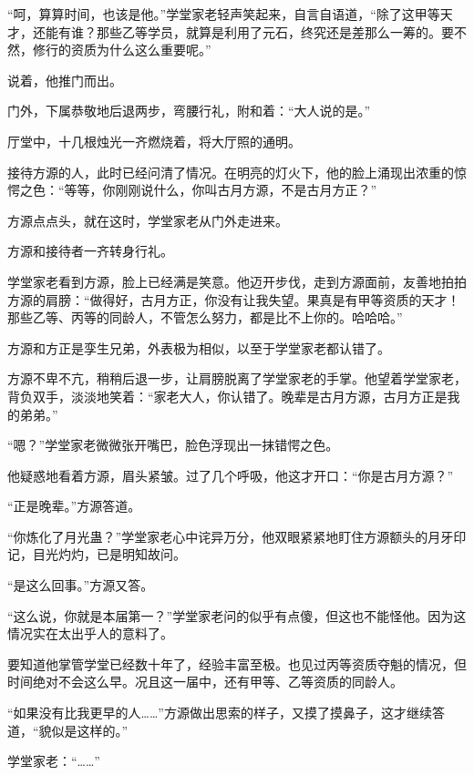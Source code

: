 \begin{this_body}
“呵，算算时间，也该是他。”学堂家老轻声笑起来，自言自语道，“除了这甲等天才，还能有谁？那些乙等学员，就算是利用了元石，终究还是差那么一筹的。要不然，修行的资质为什么这么重要呢。”

说着，他推门而出。

门外，下属恭敬地后退两步，弯腰行礼，附和着：“大人说的是。”

厅堂中，十几根烛光一齐燃烧着，将大厅照的通明。

接待方源的人，此时已经问清了情况。在明亮的灯火下，他的脸上涌现出浓重的惊愕之色：“等等，你刚刚说什么，你叫古月方源，不是古月方正？”

方源点点头，就在这时，学堂家老从门外走进来。

方源和接待者一齐转身行礼。

学堂家老看到方源，脸上已经满是笑意。他迈开步伐，走到方源面前，友善地拍拍方源的肩膀：“做得好，古月方正，你没有让我失望。果真是有甲等资质的天才！那些乙等、丙等的同龄人，不管怎么努力，都是比不上你的。哈哈哈。”

方源和方正是孪生兄弟，外表极为相似，以至于学堂家老都认错了。

方源不卑不亢，稍稍后退一步，让肩膀脱离了学堂家老的手掌。他望着学堂家老，背负双手，淡淡地笑着：“家老大人，你认错了。晚辈是古月方源，古月方正是我的弟弟。”

“嗯？”学堂家老微微张开嘴巴，脸色浮现出一抹错愕之色。

他疑惑地看着方源，眉头紧皱。过了几个呼吸，他这才开口：“你是古月方源？”

“正是晚辈。”方源答道。

“你炼化了月光蛊？”学堂家老心中诧异万分，他双眼紧紧地盯住方源额头的月牙印记，目光灼灼，已是明知故问。

“是这么回事。”方源又答。

“这么说，你就是本届第一？”学堂家老问的似乎有点傻，但这也不能怪他。因为这情况实在太出乎人的意料了。

要知道他掌管学堂已经数十年了，经验丰富至极。也见过丙等资质夺魁的情况，但时间绝对不会这么早。况且这一届中，还有甲等、乙等资质的同龄人。

“如果没有比我更早的人……”方源做出思索的样子，又摸了摸鼻子，这才继续答道，“貌似是这样的。”

学堂家老：“……”

\end{this_body}


